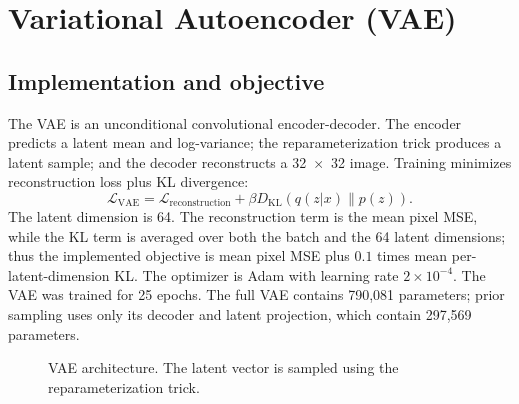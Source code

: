 \documentclass[11pt]{article}
\begin{document}
\section{Variational Autoencoder (VAE)}

\subsection{Implementation and objective}

The VAE is an unconditional convolutional encoder-decoder. The encoder predicts a latent mean and log-variance; the reparameterization trick produces a latent sample; and the decoder reconstructs a 32~$\times$~32 image. Training minimizes reconstruction loss plus KL divergence:
\[
\mathcal{L}_{\mathrm{VAE}}=
\mathcal{L}_{\mathrm{reconstruction}}+
\beta D_{\mathrm{KL}}(q(z|x)\|p(z)).
\]
The latent dimension is 64. The reconstruction term is the mean pixel MSE, while the KL term is averaged over both the batch and the 64 latent dimensions; thus the implemented objective is mean pixel MSE plus $0.1$ times mean per-latent-dimension KL. The optimizer is Adam with learning rate $2\times10^{-4}$. The VAE was trained for 25 epochs. The full VAE contains 790,081 parameters; prior sampling uses only its decoder and latent projection, which contain 297,569 parameters.

\begin{figure}[H]
\centering
{}
\caption{VAE architecture. The latent vector is sampled using the reparameterization trick.}
\end{figure}
\end{document}
